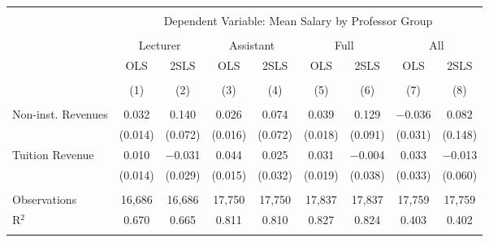 
\begin{tabular}{@{\extracolsep{5pt}}lcccccccc} 
\\[-1.8ex]\hline 
\hline \\[-1.8ex] 
 & \multicolumn{8}{c}{Dependent Variable: Mean Salary by Professor Group} \\ 
\cline{2-9} 
\\[-1.8ex] & \multicolumn{2}{c}{Lecturer} & \multicolumn{2}{c}{Assistant} & \multicolumn{2}{c}{Full} & \multicolumn{2}{c}{All} \\ 
 & OLS & 2SLS & OLS & 2SLS & OLS & 2SLS & OLS & 2SLS \\ 
\\[-1.8ex] & (1) & (2) & (3) & (4) & (5) & (6) & (7) & (8)\\ 
\hline \\[-1.8ex] 
 Non-inst. Revenues & 0.032 & 0.140 & 0.026 & 0.074 & 0.039 & 0.129 & $-$0.036 & 0.082 \\ 
  & (0.014) & (0.072) & (0.016) & (0.072) & (0.018) & (0.091) & (0.031) & (0.148) \\ 
  Tuition Revenue & 0.010 & $-$0.031 & 0.044 & 0.025 & 0.031 & $-$0.004 & 0.033 & $-$0.013 \\ 
  & (0.014) & (0.029) & (0.015) & (0.032) & (0.019) & (0.038) & (0.033) & (0.060) \\ 
 \hline \\[-1.8ex] 
Observations & 16,686 & 16,686 & 17,750 & 17,750 & 17,837 & 17,837 & 17,759 & 17,759 \\ 
R$^{2}$ & 0.670 & 0.665 & 0.811 & 0.810 & 0.827 & 0.824 & 0.403 & 0.402 \\ 
\hline 
\hline \\[-1.8ex] 
\end{tabular} 
